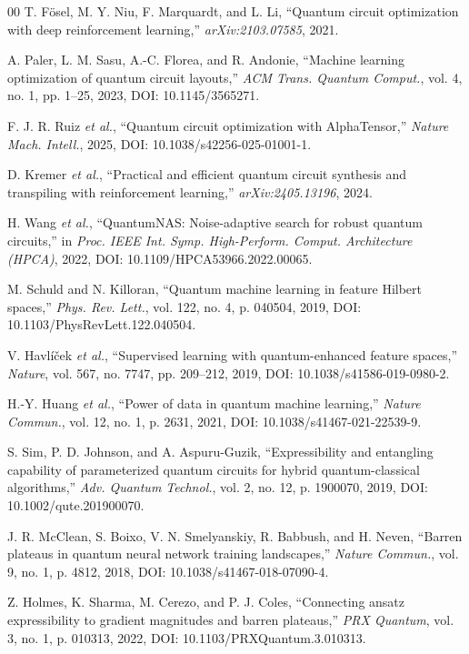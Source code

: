 \documentclass{ieeeaccess}
\begin{document}
\begin{thebibliography}{00}
 T. F{\"o}sel, M. Y. Niu, F. Marquardt, and L. Li, ``Quantum circuit optimization with deep reinforcement learning,'' \emph{arXiv:2103.07585}, 2021.

 A. Paler, L. M. Sasu, A.-C. Florea, and R. Andonie, ``Machine learning optimization of quantum circuit layouts,'' \emph{ACM Trans. Quantum Comput.}, vol. 4, no. 1, pp. 1--25, 2023, DOI: 10.1145/3565271.

 F. J. R. Ruiz \emph{et al.}, ``Quantum circuit optimization with AlphaTensor,'' \emph{Nature Mach. Intell.}, 2025, DOI: 10.1038/s42256-025-01001-1.

 D. Kremer \emph{et al.}, ``Practical and efficient quantum circuit synthesis and transpiling with reinforcement learning,'' \emph{arXiv:2405.13196}, 2024.

 H. Wang \emph{et al.}, ``QuantumNAS: Noise-adaptive search for robust quantum circuits,'' in \emph{Proc. IEEE Int. Symp. High-Perform. Comput. Architecture (HPCA)}, 2022, DOI: 10.1109/HPCA53966.2022.00065.

 M. Schuld and N. Killoran, ``Quantum machine learning in feature Hilbert spaces,'' \emph{Phys. Rev. Lett.}, vol. 122, no. 4, p. 040504, 2019, DOI: 10.1103/PhysRevLett.122.040504.

 V. Havl\'{i}\v{c}ek \emph{et al.}, ``Supervised learning with quantum-enhanced feature spaces,'' \emph{Nature}, vol. 567, no. 7747, pp. 209--212, 2019, DOI: 10.1038/s41586-019-0980-2.

 H.-Y. Huang \emph{et al.}, ``Power of data in quantum machine learning,'' \emph{Nature Commun.}, vol. 12, no. 1, p. 2631, 2021, DOI: 10.1038/s41467-021-22539-9.

 S. Sim, P. D. Johnson, and A. Aspuru-Guzik, ``Expressibility and entangling capability of parameterized quantum circuits for hybrid quantum-classical algorithms,'' \emph{Adv. Quantum Technol.}, vol. 2, no. 12, p. 1900070, 2019, DOI: 10.1002/qute.201900070.

 J. R. McClean, S. Boixo, V. N. Smelyanskiy, R. Babbush, and H. Neven, ``Barren plateaus in quantum neural network training landscapes,'' \emph{Nature Commun.}, vol. 9, no. 1, p. 4812, 2018, DOI: 10.1038/s41467-018-07090-4.

 Z. Holmes, K. Sharma, M. Cerezo, and P. J. Coles, ``Connecting ansatz expressibility to gradient magnitudes and barren plateaus,'' \emph{PRX Quantum}, vol. 3, no. 1, p. 010313, 2022, DOI: 10.1103/PRXQuantum.3.010313.


\end{thebibliography}
\end{document}
